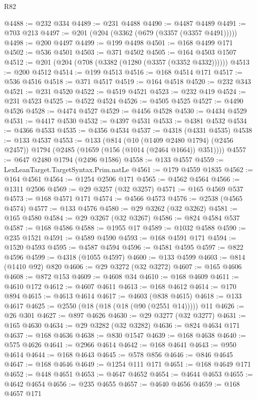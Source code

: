 \begin{lexlean}{R82}
\begin{coremodule}
@4488 := @232 @334
@4489 := @231 @4488
@4490 := @4487 @4489
@4491 := @703 @213
@4497 := @201 (@204 (@3362 (@679 (@3357 (@3357 @4491)))))
@4498 := @200 @4497
@4499 := @199 @4498
@4501 := @168 @4499 @171
@4502 := @536 @4501
@4503 := @371 @4502
@4505 := @164 @4503 @1507
@4512 := @201 (@204 (@708 (@3382 (@1280 (@3357 (@3352 @4332))))))
@4513 := @200 @4512
@4514 := @199 @4513
@4516 := @168 @4514 @171
@4517 := @536 @4516
@4518 := @371 @4517
@4519 := @164 @4518
@4520 := @232 @343
@4521 := @231 @4520
@4522 := @4519 @4521
@4523 := @232 @419
@4524 := @231 @4523
@4525 := @4522 @4524
@4526 := @4505 @4525
@4527 := @4490 @4526
@4528 := @4474 @4527
@4529 := @4456 @4528
@4530 := @4434 @4529
@4531 := @4417 @4530
@4532 := @4397 @4531
@4533 := @4381 @4532
@4534 := @4366 @4533
@4535 := @4356 @4534
@4537 := @4318 (@4331 @4535)
@4538 := @133 @4537
@4553 := @133
    (@814
      (@10 (@1409 @2480 @1794) (@2456 @2457))
      @1794
      (@2485 (@1659 (@156 (@1014 (@2464 @1664)) @351))))
@4557 := @647 @2480 @1794 (@2496 @1586)
@4558 := @133 @4557
@4559 := LexLeanTarget.TargetSyntax.Prim.natLe
@4561 := @179 @4559 @1835
@4562 := @164 @4561
@4564 := @1254 @2506 @171
@4565 := @4562 @4564
@4566 := @1311 @2506
@4569 := @29 @3257 (@32 @3257)
@4571 := @165 @4569 @537
@4573 := @168 @4571 @171
@4574 := @4566 @4573
@4576 := @2538 (@4565 @4574)
@4577 := @133 @4576
@4580 := @29 @3262 (@32 @3262)
@4581 := @165 @4580
@4584 := @29 @3267 (@32 @3267)
@4586 := @824 @4584 @537
@4587 := @168 @4586
@4588 := @1955 @17
@4589 := @1032 @4588
@4590 := @235 @1521
@4591 := @4589 @4590
@4593 := @168 @4591 @171
@4594 := @1520 @4593
@4595 := @4587 @4594
@4596 := @4581 @4595
@4597 := @822 @4596
@4599 := @4318 (@1055 @4597)
@4600 := @133 @4599
@4603 := @814 (@1410 @92) @820
@4606 := @29 @3272 (@32 @3272)
@4607 := @165 @4606
@4608 := @872 @153
@4609 := @4608 @34
@4610 := @168 @4609
@4611 := @4610 @172
@4612 := @4607 @4611
@4613 := @168 @4612
@4614 := @170 @894
@4615 := @4613 @4614
@4617 := @4603 (@838 @4615)
@4618 := @133 @4617
@4625 := @2550 (@18 (@18 (@18 (@90 (@2551 @14))))) @11
@4626 := @26 @301
@4627 := @897 @4626
@4630 := @29 @3277 (@32 @3277)
@4631 := @165 @4630
@4634 := @29 @3282 (@32 @3282)
@4636 := @824 @4634 @171
@4637 := @168 @4636
@4638 := @830 @1547
@4639 := @168 @4638
@4640 := @575 @4626
@4641 := @2966 @4614
@4642 := @168 @4641
@4643 := @950 @4614
@4644 := @168 @4643
@4645 := @578 @856
@4646 := @846 @4645
@4647 := @168 @4646
@4649 := @1254 @111 @171
@4651 := @168 @4649 @171
@4652 := @448 @4651
@4653 := @4647 @4652
@4654 := @4644 @4653
@4655 := @4642 @4654
@4656 := @235 @4655
@4657 := @4640 @4656
@4659 := @168 @4657 @171

\end{coremodule}
\end{lexlean}
